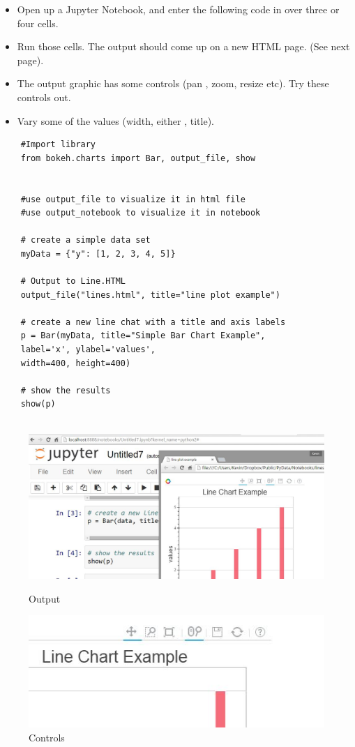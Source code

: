 \documentclass[12pt, a4paper]{report}
\begin{document}
\begin{itemize}
	\item Open up a Jupyter Notebook, and enter the following code in over three or four cells.
	\item Run those cells. The output should come up on a new HTML page. (See next page).
	\item The output graphic has some controls (pan , zoom, resize etc). Try these controls out.
	\item Vary some of the values (width, either , title).
\end{itemize}
\newpage
\begin{framed}
	\begin{verbatim}
	#Import library
	from bokeh.charts import Bar, output_file, show 
	
	
	#use output_file to visualize it in html file
	#use output_notebook to visualize it in notebook
	
	# create a simple data set
	myData = {"y": [1, 2, 3, 4, 5]}
	
	# Output to Line.HTML
	output_file("lines.html", title="line plot example") 
	
	# create a new line chat with a title and axis labels
	p = Bar(myData, title="Simple Bar Chart Example",
	label='x', ylabel='values', 
	width=400, height=400)
	
	# show the results
	show(p)
	
	\end{verbatim}
\end{framed}
\newpage
\begin{figure}[h!]
	\centering
	\includegraphics[width=0.9\linewidth]{images/OutPut}
	\caption{Output}\vspace{0.5cm}
	\includegraphics[width=0.8\linewidth]{images/TopRightCorner}
	\caption{Controls}
\end{figure}
\newpage
\end{document}
